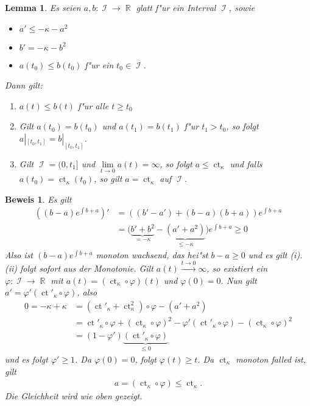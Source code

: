 \documentclass[paper=A4, twoside, chapterprefix=true, bibliography=totoc, headsepline]{scrbook}
\let\temp\phi
\let\phi\varphi
\let\varphi\temp
\let\temp\theta
\let\theta\vartheta
\let\vartheta\temp
\let\temp\epsilon
\let\epsilon\varepsilon
\let\varepsilon\temp
\let\temp\rho
\let\rho\varrho
\let\varrho\temp
\DeclareMathOperator{\R}{\mathbb{R}}
\DeclareMathOperator{\calI}{\mathcal{I}}
\DeclareMathOperator{\ct}{ct} %
\theoremstyle{plain}
\newtheorem{Lemma}[Dfn]{Lemma}
\theoremstyle{nonumberplain}
\newtheorem{bew}{Beweis}
\theoremstyle{empty}
\theoremstyle{break}
\begin{document}
\begin{Lemma}\label{thm:lemma-9-16}
  Es seien $a,b \colon \calI \to \R$ glatt f"ur ein Interval $\calI$, sowie
  \begin{itemize}
  \item $a' \leq -\kappa - a^2$
  \item $b' = -\kappa - b^2$
  \item $a(t_0) \leq b(t_0)$ f"ur ein $t_0 \in \calI$.
  \end{itemize}
  Dann gilt:
  \begin{enumerate}[label=(\roman*)]
  \item $a(t) \leq b(t)$ f"ur alle $t \ge t_0$
  \item Gilt $a(t_0) = b(t_0)$ und $a(t_1) = b(t_1)$ f"ur $t_1 > t_0$, so folgt $a|_{[t_0,t_1]} = b|_{[t_0,t_1]}$.
  \item Gilt $\calI = (0,t_1]$ und $\lim\limits_{t \to 0}a(t) = \infty$, so folgt $a \leq \ct_{\kappa}$ und falls $a(t_0) = \ct_{\kappa}(t_0)$, so gilt $a = \ct_{\kappa}$ auf $\calI$.
  \end{enumerate}
\end{Lemma}

\begin{bew}
  Es gilt
  \begin{align*}
    \left((b-a)e^{\int b+a}\right)'
    & = \left((b'-a') + (b-a)(b+a)\right)e^{\int b+a} \\
    & = \big(\underbrace{b'+b^2}_{= -\kappa} - \underbrace{(a' + a^2)}_{\leq - \kappa}\big)e^{\int b+a}
    \geq 0
  \end{align*}
  Also ist $(b-a)e^{\int b+a}$ monoton wachsend, das hei"st $b-a \geq 0$ und es gilt (i). (ii) folgt sofort aus der Monotonie.
  Gilt $a(t) \xrightarrow{t\to 0} \infty$, so existiert ein $\phi \colon \calI \to \R$ mit $a(t) = (\ct_{\kappa}\circ \phi)(t)$ und $\phi(0) = 0$.
  Nun gilt $a' = \phi'(\ct'_{\kappa} \circ \phi)$, also
  \begin{align*}
    0 = -\kappa + \kappa
    & = (\ct'_{\kappa} + \ct_{\kappa}^2) \circ \phi - (a' + a^2)\\
    & = \ct'_{\kappa} \circ \phi + (\ct_{\kappa} \circ \phi)^2 - \phi'(\ct'_{\kappa} \circ \phi) - (\ct_{\kappa} \circ \phi)^2\\
    & = (1-\phi')\underbrace{(\ct'_{\kappa} \circ \phi)}_{\leq 0}
  \end{align*}
  und es folgt $\phi' \geq 1$.
  Da $\phi(0) = 0$, folgt $\phi(t) \geq t$.
  Da $\ct_{\kappa}$ monoton falled ist, gilt
  \begin{align*}
    a = (\ct_{\kappa} \circ \phi) \leq \ct_{\kappa}.
  \end{align*}
  Die Gleichheit wird wie oben gezeigt.
\end{bew}
\end{document}
